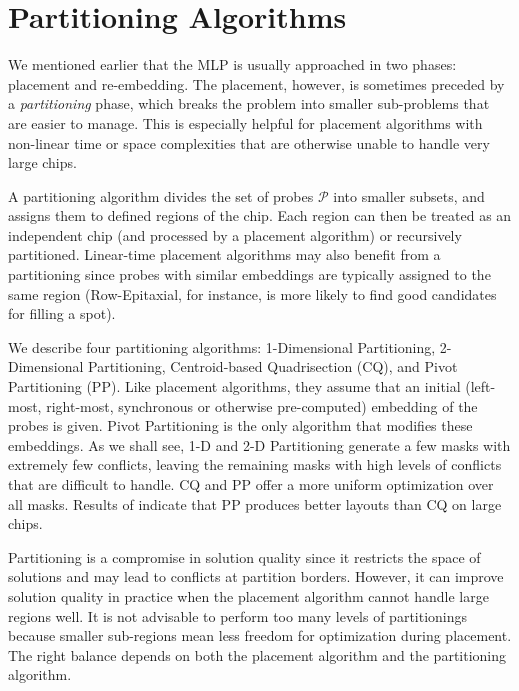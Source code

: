 \chapter{Partitioning Algorithms}
\label{ch:part}

We mentioned earlier that the MLP is usually approached in two phases:
placement and re-embedding. The placement, however, is sometimes
preceded by a \emph{partitioning} phase, which breaks the problem into
smaller sub-problems that are easier to manage. This is especially
helpful for placement algorithms with non-linear time or space
complexities that are otherwise unable to handle very large chips.

A partitioning algorithm divides the set of probes $\mathcal{P}$ into smaller
subsets, and assigns them to defined regions of the chip. Each region can then
be treated as an independent chip (and processed by a placement algorithm) or
recursively partitioned. Linear-time placement algorithms may also benefit from
a partitioning since probes with similar embeddings are typically assigned to
the same region (Row-Epitaxial, for instance, is more likely to find good
candidates for filling a spot).

We describe four partitioning algorithms: 1-Dimensional Partitioning,
2-Dimen\-sional Partitioning, Centroid-based Quadrisection (CQ), and
Pivot Partitioning (PP). Like placement algorithms, they assume that
an initial (left-most, right-most, synchronous or otherwise
pre-computed) embedding of the probes is given. Pivot Partitioning is
the only algorithm that modifies these embeddings.  As we shall see,
1-D and 2-D Partitioning generate a few masks with extremely few
conflicts, leaving the remaining masks with high levels of conflicts
that are difficult to handle. CQ and PP offer a more uniform
optimization over all masks. Results of \citet{Carvalho2006} indicate
that PP produces better layouts than CQ on large chips.

Partitioning is a compromise in solution quality since it restricts
the space of solutions and may lead to conflicts at partition borders.
However, it can improve solution quality in practice when the
placement algorithm cannot handle large regions well. It is not
advisable to perform too many levels of partitionings because smaller
sub-regions mean less freedom for optimization during placement. The
right balance depends on both the placement algorithm and the
partitioning algorithm.


